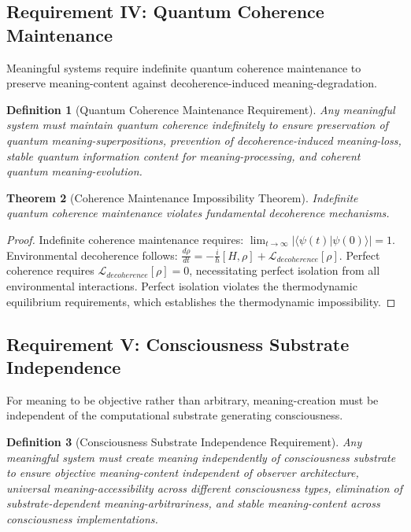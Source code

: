 \documentclass[12pt,a4paper]{article}
\newtheorem{theorem}{Theorem}[section]
\newtheorem{definition}[theorem]{Definition}
\begin{document}
\subsection{Requirement IV: Quantum Coherence Maintenance}

Meaningful systems require indefinite quantum coherence maintenance to preserve meaning-content against decoherence-induced meaning-degradation.

\begin{definition}[Quantum Coherence Maintenance Requirement]
Any meaningful system must maintain quantum coherence indefinitely to ensure preservation of quantum meaning-superpositions, prevention of decoherence-induced meaning-loss, stable quantum information content for meaning-processing, and coherent quantum meaning-evolution.
\end{definition}

\begin{theorem}[Coherence Maintenance Impossibility Theorem]
Indefinite quantum coherence maintenance violates fundamental decoherence mechanisms.
\end{theorem}

\begin{proof}
Indefinite coherence maintenance requires: $\lim_{t \to \infty} |\langle\psi(t)|\psi(0)\rangle| = 1$. Environmental decoherence follows: $\frac{d\rho}{dt} = -\frac{i}{\hbar}[H,\rho] + \mathcal{L}_{decoherence}[\rho]$. Perfect coherence requires $\mathcal{L}_{decoherence}[\rho] = 0$, necessitating perfect isolation from all environmental interactions. Perfect isolation violates the thermodynamic equilibrium requirements, which establishes the thermodynamic impossibility.
\end{proof}

\subsection{Requirement V: Consciousness Substrate Independence}

For meaning to be objective rather than arbitrary, meaning-creation must be independent of the computational substrate generating consciousness.

\begin{definition}[Consciousness Substrate Independence Requirement]
Any meaningful system must create meaning independently of consciousness substrate to ensure objective meaning-content independent of observer architecture, universal meaning-accessibility across different consciousness types, elimination of substrate-dependent meaning-arbitrariness, and stable meaning-content across consciousness implementations.
\end{definition}
\end{document}
